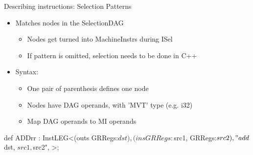 
\begin{frame}[fragile]{Describing instructions: Selection Patterns}

\begin{itemize}
    \item Matches nodes in the SelectionDAG
    \begin{itemize}
        \item Nodes get turned into MachineInstrs during ISel
        \item If pattern is omitted, selection needs to be done in C++
    \end{itemize}
    \item Syntax:
    \begin{itemize}
        \item One pair of parenthesis defines one node
        \item Nodes have DAG operands, with 'MVT' type (e.g. i32)
        \item Map DAG operands to MI operands
    \end{itemize}
\end{itemize}

\begin{codebox}[commandchars=\\\{\}]
def ADDrr : InstLEG<(outs GRRegs:$dst),
                    (ins GRRegs:$src1, GRRegs:$src2),
                    "add $dst, $src1, $src2",
                    >;
\end{codebox}

\end{frame}


